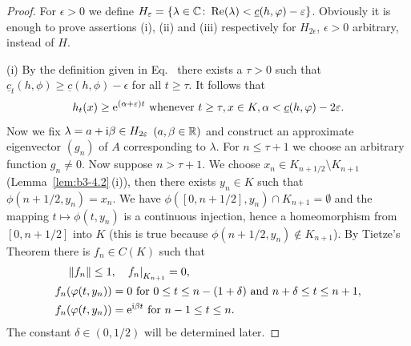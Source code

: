 \begin{proof}
	For $\epsilon > 0$ we define $H_{\epsilon} = \{\lambda \in \C \colon \Re(\lambda) < \underline{c}(h,\phi)-\epsilon\}$.
	Obviously it is enough to prove assertions (i), (ii) and (iii) respectively for $H_{2\epsilon}$, $\epsilon> 0$ arbitrary, instead of\/ $H$.

	(i) By the definition given in Eq.~ there exists a $\tau > 0$ such that $\underline{c}_{t}(h,\phi) \geq \underline{c}(h,\phi) - \epsilon$ for all $t \geq \tau$.
	It follows that
	\begin{equation}\label{eq:b3-4.5}
		h_{t}(x) \geq \eu^{(\alpha + \epsilon)t} \text{ whenever } t \geq \tau, x \in K, \alpha < \underline{c}(h,\phi)-2\epsilon .
	\end{equation}
	Now we fix $\lambda = a + \im\beta \in H_{2\epsilon}$ $(a,\beta \in \mathbb{R})$ and construct an approximate eigenvector $(g_{n})$ of\/ $A$ 
    corresponding to $\lambda$.
	For $n \leq \tau + 1$ we choose an arbitrary function $g_{n} \neq 0$.
	Now suppose $n > \tau + 1$.
	We choose $x_{n} \in K_{n+1/2} \setminus K_{n+1}$ (\cf Lemma~\ref{lem:b3-4.2}\,(i)), then there exists $y_{n} \in K$ such that $\phi(n+1/2,y_{n}) = x_{n}$.
	We have $\phi([0,n+1/2],y_{n}) \cap K_{n+1} = \emptyset$ and the mapping $t \mapsto \phi(t,y_{n})$ is a continuous injection, hence a homeomorphism from $[0,n+1/2]$ into $K$ (this is true because $\phi(n+1/2,y_{n}) \notin K_{n+1}$).
	By Tietze's Theorem there is $f_{n} \in C(K)$ such that
	\begin{equation}\label{eq:b3-4.6}
		\begin{aligned}
			\|f_{n}\| \leq 1 &, \quad {f_{n}|}_{K_{n+1}} = 0 ,  \\
			f_{n}(\phi(t,y_{n})) &= 0 \text{ for } 0 \leq t \leq n-(1+\delta) \text{ and } n+\delta \leq t \leq n+1 ,  \\
			f_{n}(\phi(t,y_{n})) &= \eu^{\im\beta  t} \text{ for } n-1 \leq t \leq n .
		\end{aligned}
	\end{equation}
	The constant $\delta \in (0,1/2)$ will be determined later.
	

\end{proof}
